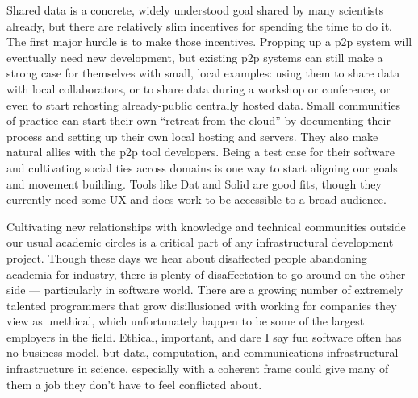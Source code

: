 \documentclass[10pt]{article}
\begin{document}
\begin{multicols}{2}
Shared data is a concrete, widely understood goal shared by many
scientists already, but there are relatively slim incentives for
spending the time to do it. The first major hurdle is to make those
incentives. Propping up a p2p system will eventually need new
development, but existing p2p systems can still make a strong case for
themselves with small, local examples: using them to share data with
local collaborators, or to share data during a workshop or conference,
or even to start rehosting already-public centrally hosted data. Small
communities of practice can start their own ``retreat from the cloud''
by documenting their process and setting up their own local hosting and
servers. They also make natural allies with the p2p tool developers.
Being a test case for their software and cultivating social ties across
domains is one way to start aligning our goals and movement building.
Tools like Dat and Solid are good fits, though they currently need some
UX and docs work to be accessible to a broad audience.

Cultivating new relationships with knowledge and technical communities
outside our usual academic circles is a critical part of any
infrastructural development project. Though these days we hear about
disaffected people abandoning academia for industry, there is plenty of
disaffectation to go around on the other side --- particularly in
software world. There are a growing number of extremely talented
programmers that grow disillusioned with working for companies they view
as unethical, which unfortunately happen to be some of the largest
employers in the field. Ethical, important, and dare I say fun software
often has no business model, but data, computation, and communications
infrastructural infrastructure in science, especially with a coherent
frame could give many of them a job they don't have to feel conflicted
about.

\begin{itemize}


\end{itemize}
\end{multicols}
\end{document}
